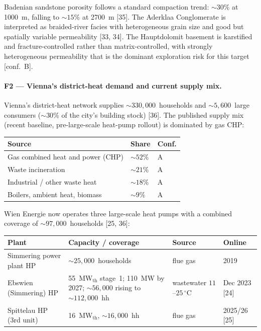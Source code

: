 \documentclass{article}
\begin{document}
Badenian sandstone porosity follows a standard compaction trend:
$\sim 30\%$ at 1000~m, falling to $\sim 15\%$ at 2700~m [35]. The
Aderklaa Conglomerate is interpreted as braided-river facies with
heterogeneous grain size and good but spatially variable
permeability [33, 34]. The Hauptdolomit basement is karstified
and fracture-controlled rather than matrix-controlled, with
strongly heterogeneous permeability that is the dominant
exploration risk for this target [conf.\ B].

\paragraph{F2 --- Vienna's district-heat demand and current supply mix.}
Vienna's district-heat network supplies $\sim 330{,}000$~households
and $\sim 5{,}600$~large consumers ($\sim 30\%$ of the city's
building stock) [36]. The published supply mix (recent baseline,
pre-large-scale heat-pump rollout) is dominated by gas CHP:

\begin{center}
\begin{tabular}{lll}
\hline
\textbf{Source} & \textbf{Share} & \textbf{Conf.} \\
\hline
Gas combined heat and power (CHP)      & $\sim 52\%$ & A \\
Waste incineration                     & $\sim 21\%$ & A \\
Industrial / other waste heat          & $\sim 18\%$ & A \\
Boilers, ambient heat, biomass         & $\sim 9\%$  & A \\
\hline
\end{tabular}
\end{center}

Wien Energie now operates three large-scale heat pumps with a
combined coverage of $\sim 97{,}000$~households [25, 36]:

\begin{center}
\begin{tabular}{llll}
\hline
\textbf{Plant} & \textbf{Capacity / coverage} & \textbf{Source} & \textbf{Online} \\
\hline
Simmering power plant HP     & $\sim 25{,}000$~households   & flue gas         & 2019 \\
Ebswien (Simmering) HP       & 55~MW$_{\mathrm{th}}$ stage~1; 110~MW by 2027; $\sim 56{,}000$ rising to $\sim 112{,}000$~hh & wastewater $11$--$25\,^\circ$C & Dec 2023 [24] \\
Spittelau HP (3rd unit)      & 16~MW$_{\mathrm{th}}$, $\sim 16{,}000$~hh           & flue gas         & 2025/26 [25] \\
\hline
\end{tabular}
\end{center}
\end{document}
